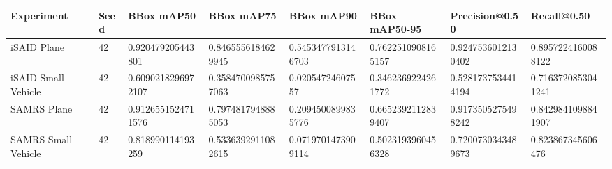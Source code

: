 \begin{tabular}{llllllll}
\toprule
Experiment & Seed & BBox mAP50 & BBox mAP75 & BBox mAP90 & BBox mAP50-95 & Precision@0.50 & Recall@0.50 \\
\midrule
iSAID Plane & 42 & 0.920479205443801 & 0.8465556184629945 & 0.5453477913146703 & 0.7622510908165157 & 0.9247536012130402 & 0.8957224160088122 \\
iSAID Small Vehicle & 42 & 0.6090218296972107 & 0.3584700985757063 & 0.02054724607557 & 0.3462369224261772 & 0.5281737534414194 & 0.7163720853041241 \\
SAMRS Plane & 42 & 0.9126551524711576 & 0.7974817948885053 & 0.2094500899835776 & 0.6652392112839407 & 0.9173505275498242 & 0.8429841098841907 \\
SAMRS Small Vehicle & 42 & 0.818990114193259 & 0.5336392911082615 & 0.0719701473909114 & 0.5023193960456328 & 0.7200730343489673 & 0.823867345606476 \\
\bottomrule
\end{tabular}
